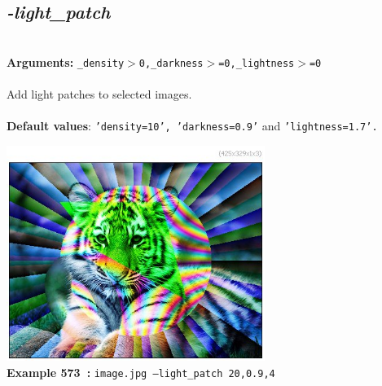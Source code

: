 \documentclass[a4paper,11pt,twoside]{book}
\begin{document}
\subsection{\emph{-light\_patch} }\vspace*{-0.5em}
~\\\textbf{Arguments: } 
{\small \texttt{\_density$>$0,\_darkness$>$=0,\_lightness$>$=0}}\\~\\
Add light patches to selected images.
~\\~\\\textbf{Default values}: {\small \texttt{'density=10', 'darkness=0.9'} and \texttt{'lightness=1.7'.}}
\begin{center}\includegraphics[keepaspectratio=true,height=7cm,width=\textwidth]{img/gmic_def573.jpg}\\
{\footnotesize \textbf{Example 573~:} \texttt{image.jpg --light\_patch 20,0.9,4}}
\end{center}
\end{document}
